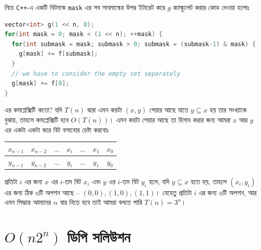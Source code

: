 নিচে \texttt{C++}-এ
একটি বিটমাস্ক \texttt{mask} এর সব সাবমাস্কের উপর ইটারেট করে $g$ ক্যাল্কুলেট
করার কোড দেওয়া হলোঃ
\begin{lstlisting}[language=C++]
vector<int> g(1 << n, 0);
for(int mask = 0; mask < (1 << n); ++mask) {
  for(int submask = mask; submask > 0; submask = (submask-1) & mask) {
    g[mask] += f[submask];
  }
  // we have to consider the empty set seperately
  g[mask] += f[0];
}
\end{lstlisting}
এর কমপ্লেক্সিটি কতো? যদি $T(n)$ দ্বারা এমন কয়টা $(x, y)$ পেয়ার আছে যাতে $y
\subseteq x$ হয় তার সংখ্যাকে বুঝায়, তাহলে কমপ্লেক্সিটি হবে $O(T(n))$। এমন
কয়টা পেয়ার আছে তা হিসাব করার জন্য আমরা $x$ আর $y$ এর একটা একটা করে বিট বসানোর
চেষ্টা করবোঃ
\begin{center}
  \begin{tabular}{|c|c|c|c|c|c|c|}
    \hline
    $x_{n-1}$ & $x_{n-2}$ & $\dots$ & $x_i$ & $\dots$ & $x_{1}$ & $x_{0}$\\
    \hline
    $y_{n-1}$ & $y_{n-2}$ & $\dots$ & $y_i$ & $\dots$ & $y_{1}$ & $y_{0}$\\
    \hline
  \end{tabular}
\end{center}
প্রতিটা $i$ এর জন্য $x$ এর $i$-তম বিট $x_i$ এবং $y$ এর $i$-তম বিট $y_i$ হলে,
যদি $y \subseteq x$ হতে হয়, তাহলে $(x_i, y_i)$ এর জন্য ঠিক ৩টি অপশন আছে --
$(0, 0), (1, 0), (1, 1)$। যেহেতু প্রতিটা $i$ এর জন্য ৩টি অপশন, আর এমন
সিদ্ধান্ত আমাদের $n$ বার নিতে হবে তাই আমরা বলতে পারি $T(n) = 3^n$।

\section{\texorpdfstring{$O(n2^n)$}{O(n pow(2, n))} ডিপি সলিউশন}

